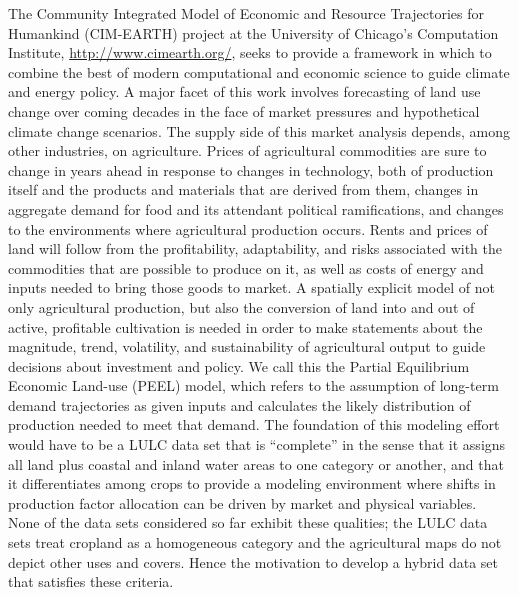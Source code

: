 The Community Integrated Model of Economic and Resource Trajectories
for Humankind (CIM-EARTH) project at the University of Chicago's
Computation Institute, \url{http://www.cimearth.org/}, seeks to
provide a framework in which to combine the best of modern
computational and economic science to guide climate and energy policy.
A major facet of this work involves forecasting of land use change
over coming decades in the face of market pressures and hypothetical
climate change scenarios.  The supply side of this market analysis
depends, among other industries, on agriculture.  Prices of
agricultural commodities are sure to change in years ahead in response
to changes in technology, both of production itself and the products
and materials that are derived from them, changes in aggregate demand
for food and its attendant political ramifications, and changes to the
environments where agricultural production occurs.  Rents and prices
of land will follow from the profitability, adaptability, and risks
associated with the commodities that are possible to produce on it, as
well as costs of energy and inputs needed to bring those goods to
market.  A spatially explicit model of not only agricultural
production, but also the conversion of land into and out of active,
profitable cultivation is needed in order to make statements about the
magnitude, trend, volatility, and sustainability of agricultural
output to guide decisions about investment and policy.  We call this
the Partial Equilibrium Economic Land-use (PEEL) model, which refers
to the assumption of long-term demand trajectories as given inputs and
calculates the likely distribution of production needed to meet that
demand.  The foundation of this modeling effort would have to be a
LULC data set that is ``complete'' in the sense that it assigns all
land plus coastal and inland water areas to one category or another,
and that it differentiates among crops to provide a modeling environment
where shifts in production factor allocation can be driven by market
and physical variables.  None of the data sets considered so far
exhibit these qualities; the LULC data sets treat cropland as a
homogeneous category and the agricultural maps do not depict other uses
and covers.  Hence the motivation to develop a hybrid data set that
satisfies these criteria.

